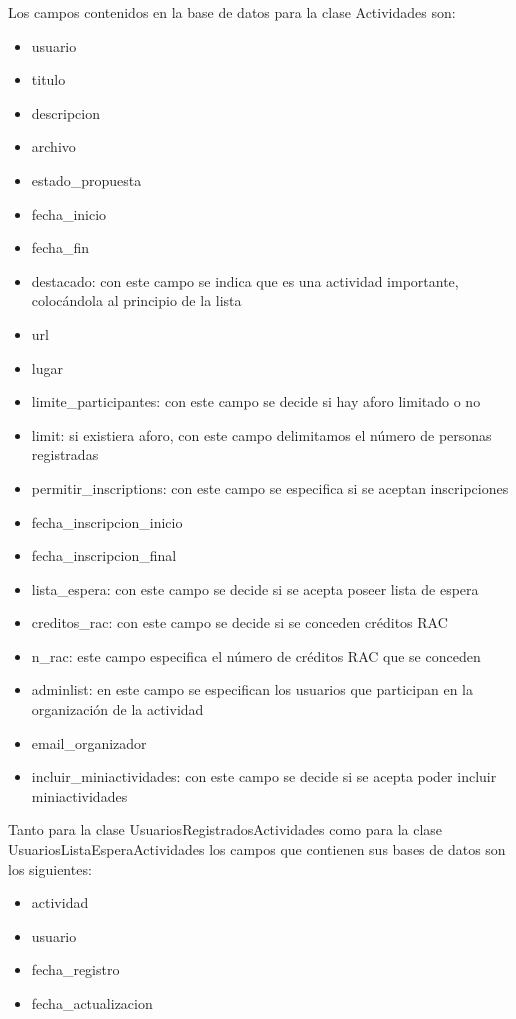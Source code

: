 \begin{itemize}
Los campos contenidos en la base de datos para la clase Actividades son:
	\begin{itemize}
		\item usuario
		\item titulo
		\item descripcion
		\item archivo
		\item estado\_propuesta 
		\item fecha\_inicio
		\item fecha\_fin
		\item destacado: con este campo se indica que es una actividad importante, colocándola al principio de la lista
		\item url
		\item  lugar
		\item limite\_participantes: con este campo se decide si hay aforo limitado o no
		\item limit: si existiera aforo, con este campo delimitamos el número de personas registradas
		\item permitir\_inscriptions: con este campo se especifica si se aceptan inscripciones
		\item fecha\_inscripcion\_inicio
		\item fecha\_inscripcion\_final
		\item lista\_espera: con este campo se decide si se acepta poseer lista de espera		
		\item creditos\_rac: con este campo se decide si se conceden créditos RAC
		\item n\_rac: este campo especifica el número de créditos RAC que se conceden
		\item adminlist: en este campo se especifican los usuarios que participan en la organización de la actividad
		\item email\_organizador
		\item incluir\_miniactividades: con este campo se decide si se acepta poder incluir miniactividades
	\end{itemize}	
	
Tanto para la clase UsuariosRegistradosActividades como para la clase UsuariosListaEsperaActividades los campos que contienen sus bases de datos son los siguientes:
	\begin{itemize}
		\item actividad
		\item usuario
		\item fecha\_registro
		\item fecha\_actualizacion
	\end{itemize}
	

\end{itemize}
